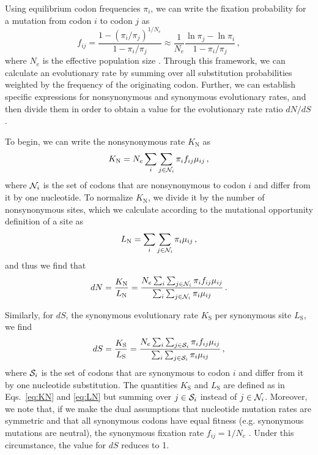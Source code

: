 \documentclass{pnastwo}
\begin{document}
\begin{article}
Using equilibrium codon frequencies $\pi_i$, we can write the fixation probability for a mutation from codon $i$ to codon $j$ as
\begin{equation}\label{eq:f_ij}
 f_{ij} = \frac{1-(\pi_i/\pi_j)^{1/N_e}}{1-\pi_i/\pi_j}
  \approx \frac{1}{N_e} \frac{\ln \pi_j - \ln \pi_i}{1-\pi_i/\pi_j}\,,
\end{equation}
where $N_e$ is the effective population size \cite{HalpernBruno1998,SellaHirsh2005}. Through this framework, we can calculate an evolutionary rate by summing over all substitution probabilities weighted by the frequency of the originating codon. Further, we can establish specific expressions for nonsynonymous and synonymous evolutionary rates, and then divide them in order to obtain a value for the evolutionary rate ratio $dN/dS$.

To begin, we can write the nonsynonymous rate $K_\text{N}$ as 
\begin{equation}\label{eq:KN}
  K_\text{N} = N_e \sum_i \sum_{j \in {\cal N}_i} \pi_i  f_{ij}\mu_{ij}\,,
\end{equation}
where ${\cal N}_i$ is the set of codons that are nonsynonymous to codon $i$ and differ from it by one nucleotide. To normalize $K_\text{N}$, we divide it by the number of nonsynonymous sites, which we calculate according to the mutational opportunity definition of a site \cite{GoldmanYang1994, Yang2006} as 
\begin{equation}\label{eq:LN}
  L_\text{N} = \sum_i \sum_{j \in {\cal N}_i} \pi_i \mu_{ij}\,, 
\end{equation} and thus we find that 
\begin{equation}\label{eq:dN}
  dN = \frac{K_\text{N}}{L_\text{N}}=\frac{ N_e \sum_i \sum_{j \in {\cal N}_i} \pi_i f_{ij} \mu_{ij} } {\sum_i \sum_{j \in {\cal N}_i} \pi_i \mu_{ij} }\,.
\end{equation}

Similarly, for $dS$, the synonymous evolutionary rate $K_\text{S}$ per synonymous site $L_\text{S}$, we find
\begin{equation}\label{eq:dS}
  dS = \frac{K_\text{S}}{L_\text{S}}=\frac{ N_e \sum_i \sum_{j \in {\cal S}_i} \pi_i f_{ij} \mu_{ij} } {\sum_i \sum_{j \in {\cal S}_i} \pi_i \mu_{ij} }\,,
\end{equation}
where ${\cal S}_i$ is the set of codons that are synonymous to codon $i$ and differ from it by one nucleotide substitution. The quantities $K_\text{S}$ and $L_\text{S}$ are defined as in Eqs.~\eqref{eq:KN} and \eqref{eq:LN} but summing over $j\in {\cal S}_i$ instead of $j\in {\cal N}_i$. Moreover, we note that, if we make the dual assumptions that nucleotide mutation rates are symmetric and that all synonymous codons have equal fitness (e.g. synonymous mutations are neutral), the synonymous fixation rate $f_{ij}= 1/N_e$ \cite{CrowKimura1970}. Under this circumstance, the value for $dS$ reduces to 1.



\end{article}
\end{document}
